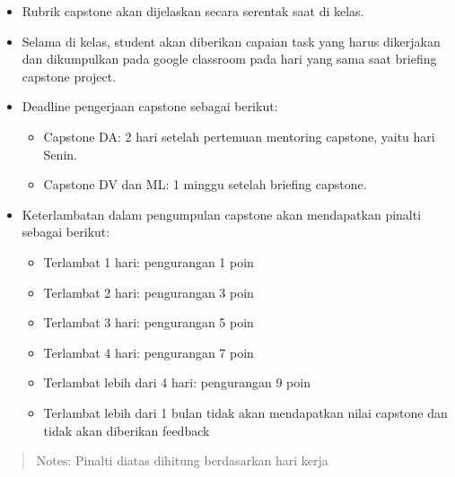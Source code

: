 \documentclass[
]{book}
\providecommand{\tightlist}{%
  \setlength{\itemsep}{0pt}\setlength{\parskip}{0pt}}
\begin{document}
\begin{itemize}
\tightlist
\item
  Rubrik capstone akan dijelaskan secara serentak saat di kelas.
\item
  Selama di kelas, student akan diberikan capaian task yang harus dikerjakan dan dikumpulkan pada google classroom pada hari yang sama saat briefing capstone project.
\item
  Deadline pengerjaan capstone sebagai berikut:

  \begin{itemize}
  \tightlist
  \item
    Capstone DA: 2 hari setelah pertemuan mentoring capstone, yaitu hari Senin.
  \item
    Capstone DV dan ML: 1 minggu setelah briefing capstone.
  \end{itemize}
\item
  Keterlambatan dalam pengumpulan capstone akan mendapatkan pinalti sebagai berikut:

  \begin{itemize}
  \tightlist
  \item
    Terlambat 1 hari: pengurangan 1 poin
  \item
    Terlambat 2 hari: pengurangan 3 poin
  \item
    Terlambat 3 hari: pengurangan 5 poin
  \item
    Terlambat 4 hari: pengurangan 7 poin
  \item
    Terlambat lebih dari 4 hari: pengurangan 9 poin
  \item
    Terlambat lebih dari 1 bulan tidak akan mendapatkan nilai capstone dan tidak akan diberikan feedback
  \end{itemize}
\end{itemize}

\begin{quote}
Notes: Pinalti diatas dihitung berdasarkan hari kerja
\end{quote}
\end{document}
